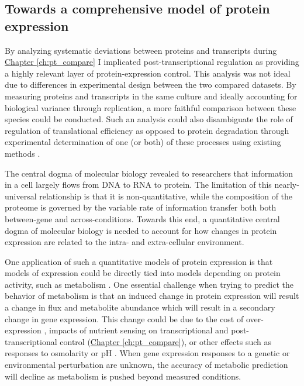 \subsection{Towards a comprehensive model of protein expression}

By analyzing systematic deviations between proteins and transcripts during \hyperref[ch:pt_compare]{Chapter \ref{ch:pt_compare}} I implicated post-transcriptional regulation as providing a highly relevant layer of protein-expression control. This analysis was not ideal due to differences in experimental design between the two compared datasets. By measuring proteins and transcripts in the same culture and ideally accounting for biological variance through replication, a more faithful comparison between these species could be conducted.  Such an analysis could also disambiguate the role of regulation of translational efficiency as opposed to protein degradation through experimental determination of one (or both) of these processes using existing methods \cite{Ingolia:2009dp, Belle:2006hv}.

The central dogma of molecular biology revealed to researchers that information in a cell largely flows from DNA to RNA to protein. The limitation of this nearly-universal relationship is that it is non-quantitative, while the composition of the proteome is governed by the variable rate of information transfer both both between-gene and across-conditions. Towards this end, a quantitative central dogma of molecular biology is needed to account for how changes in protein expression are related to the intra- and extra-cellular environment.

One application of such a quantitative models of protein expression is that models of expression could be directly tied into models depending on protein activity, such as metabolism \cite{OBrien:2013fl}.  One essential challenge when trying to predict the behavior of metabolism is that an induced change in protein expression will result a change in flux and metabolite abundance which will result in a secondary change in gene expression. This change could be due to the cost of over-expression \cite{Dykhuizen:1987uq}, impacts of nutrient sensing on transcriptional \cite{Brauer:2008jn} and post-transcriptional control (\hyperref[ch:pt_compare]{Chapter \ref{ch:pt_compare}}), or other effects such as responses to osmolarity or pH \cite{Csonka:1991wf}. When gene expression responses to a genetic or environmental perturbation are unknown, the accuracy of metabolic prediction will decline as metabolism is pushed beyond measured conditions.

